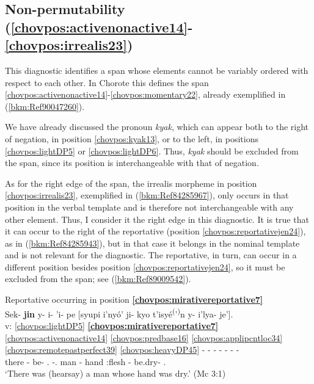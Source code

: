\documentclass[output=paper]{langscibook}
\begin{document}
\subsection{Non-permutability (\ref{chovpos:activenonactive14}{}-\ref{chovpos:irrealis23})}

This diagnostic identifies a span whose elements cannot be variably ordered with respect to each other. In Chorote this defines the span \ref{chovpos:activenonactive14}{}-\ref{chovpos:momentary22}, already exemplified in (\ref{bkm:Ref90047260}).

We have already discussed the pronoun \textit{kyak}, which can appear both to the right of negation, in position \ref{chovpos:kyak13}, or to the left, in positions \ref{chovpos:lightDP5} or \ref{chovpos:lightDP6}. Thus, \textit{kyak} should be excluded from the span, since its position is interchangeable with that of negation.

As for the right edge of the span, the irrealis morpheme in position \ref{chovpos:irrealis23}, exemplified in (\ref{bkm:Ref84285967}), only occurs in that position in the verbal template and is therefore not interchangeable with any other element. Thus, I consider it the right edge in this diagnostic. It is true that it can occur to the right of the reportative (position \ref{chovpos:reportativejen24}), as in (\ref{bkm:Ref84285943}), but in that case it belongs in the nominal template and is not relevant for the diagnostic. The reportative, in turn, can occur in a different position besides position \ref{chovpos:reportativejen24}, so it must be excluded from the span; see (\ref{bkm:Ref89009542}).

\ea\label{bkm:Ref89009542} Reportative occurring in position \textbf{\ref{chovpos:mirativereportative7}} \\ 
\glll {} Sek- \textbf{jin} y- i- 'i- pe [syupi i'nyó' ji- kyo t'isyé\textsuperscript{(}'\textsuperscript{)}n y- i'lya- je'].\\
v: \ref{chovpos:lightDP5} \textbf{\ref{chovpos:mirativereportative7}} \ref{chovpos:activenonactive14} \ref{chovpos:predbase16} \ref{chovpos:applipcntloc34} \ref{chovpos:remotepastperfect39} \ref{chovpos:heavyDP45} - - - - - - - \\ 
{} there \textbf{\Rep{}} \Third{}- be- \Ap.\Punct{} -\Rem.\Pst{} \Dem{} man \Third\Poss{}- hand \Third\Poss{}:flesh \Third{}- be.dry- \Ap.\Loc{}\\
\glt `There was (hearsay) a man whose hand was dry.' (Mc 3:1) 
\z 
\end{document}
